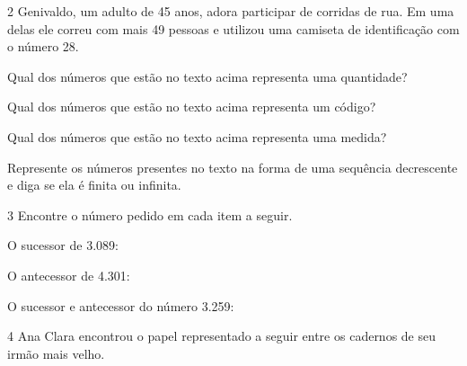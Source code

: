 \num{2} Genivaldo, um adulto de 45 anos, adora participar de corridas de
rua. Em uma delas ele correu com mais 49 pessoas e utilizou uma camiseta
de identificação com o número 28.

\begin{escolha}
\item
  Qual dos números que estão no texto acima representa uma
  quantidade?


\item
  Qual dos números que estão no texto acima representa um
  código?


\item
  Qual dos números que estão no texto acima representa uma
  medida?


\item
  Represente os números presentes no texto na forma de uma sequência
  decrescente e diga se ela é finita ou infinita.

\end{escolha}

\num{3} Encontre o número pedido em cada item a seguir.

\begin{escolha}
\item
  O sucessor de 3.089: 
\item
  O antecessor de 4.301: 
\item
  O sucessor e antecessor do número 3.259: 
\end{escolha}


\pagebreak
\num{4} Ana Clara encontrou o papel representado a seguir entre os cadernos de seu irmão mais velho.


